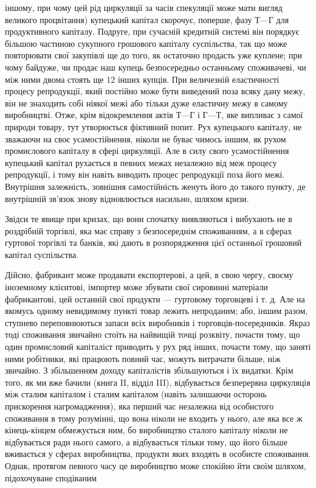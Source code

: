 \parcont{}  %
іншому, при чому цей рід циркуляції за часів спекуляції може
мати вигляд великого процвітання) купецький капітал скорочує,
поперше, фазу $Т — Г$ для продуктивного капіталу. Подруге, при
сучасній кредитній системі він порядкує більшою частиною
сукупного грошового капіталу суспільства, так що може повторювати
свої закупівлі ще до того, як остаточно продасть уже
куплене; при чому байдуже, чи продає наш купець безпосередньо
останньому споживачеві, чи між ними двома стоять ще
12 інших купців. При величезній еластичності процесу репродукції,
який постійно може бути виведений поза всяку дану
межу, він не знаходить собі ніякої межі або тільки дуже еластичну
межу в самому виробництві. Отже, крім відокремлення актів
$Т — Г$ і $Г — Т$, яке випливає з самої природи товару, тут утворюється
фіктивний попит. Рух купецького капіталу, не зважаючи
на своє усамостійнення, ніколи не буває чимось іншим, як рухом
промислового капіталу в сфері циркуляції. Але в силу свого
усамостійнення купецький капітал рухається в певних межах незалежно
від меж процесу репродукції, і тому він навіть виводить
процес репродукції поза його межі. Внутрішня залежність, зовнішня
самостійність женуть його до такого пункту, де внутрішній
зв’язок знову відновлюється насильно, шляхом кризи.

Звідси те явище при кризах, що вони спочатку виявляються
і вибухають не в роздрібній торгівлі, яка має справу з безпосереднім
споживанням, а в сферах гуртової торгівлі та банків,
які дають в розпорядження цієї останньої грошовий капітал
суспільства.

Дійсно, фабрикант може продавати експортерові, а цей, в свою
чергу, своєму іноземному клієнтові, імпортер може збувати
свої сировинні матеріали фабрикантові, цей останній свої продукти
— гуртовому торговцеві і т. д. Але на якомусь одному
невидимому пункті товар лежить непроданим; або, іншим разом,
ступнево переповнюються запаси всіх виробників і торговців-посередників.
Якраз тоді споживання звичайно стоїть на найвищій
точці розквіту, почасти тому, що один промисловий капіталіст
приводить у рух ряд інших, почасти тому, що заняті
ними робітники, які працюють повний час, можуть витрачати
більше, ніж звичайно. З збільшенням доходу капіталістів збільшуються
і їх видатки. Крім того, як ми вже бачили (книга II,
відділ III), відбувається безперервна циркуляція між сталим капіталом
і сталим капіталом (навіть залишаючи осторонь прискорення
нагромадження), яка перший час незалежна від особистого
споживання в тому розумінні, що вона ніколи не входить
у нього, але яка все ж кінець-кінцем обмежується ним,
бо виробництво сталого капіталу ніколи не відбувається ради
нього самого, а відбувається тільки тому, що його більше
вживається у сферах виробництва, продукти яких входять в особисте
споживання. Однак, протягом певного часу це виробництво
може спокійно йти своїм шляхом, підохочуване сподіваним
\parbreak{}  %
